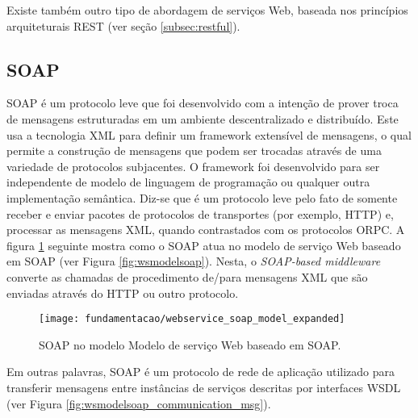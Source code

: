 Existe também outro tipo de abordagem de serviços Web, baseada nos princípios arquiteturais REST (ver seção \ref{subsec:restful}).

\subsection{SOAP}
\label{subsec:soap}
SOAP é um protocolo leve que foi desenvolvido com a intenção de prover troca de mensagens estruturadas em um ambiente descentralizado e distribuído. Este usa a tecnologia XML para definir um framework extensível de mensagens, o qual permite a construção de mensagens que podem ser trocadas através de uma variedade de protocolos subjacentes. O framework foi desenvolvido para ser independente de modelo de linguagem de programação ou qualquer outra implementação semântica\cite{w3c:soap}. Diz-se que é um protocolo leve pelo fato de somente receber e enviar pacotes de protocolos de transportes (por exemplo, HTTP) e, processar as mensagens XML, quando contrastados com os protocolos ORPC\cite{Papazoglou_slides:2008}. A figura \ref{fig:wsmodelsoap_expanded} seguinte mostra como o SOAP atua no modelo de serviço Web baseado em SOAP (ver Figura \ref{fig:wsmodelsoap}). Nesta, o \textit{SOAP-based middleware} converte as chamadas de procedimento de/para mensagens XML que são enviadas através do HTTP ou outro protocolo.

\begin{figure}[!htb] \centering 
  \centering
  \texttt{[image: fundamentacao/webservice\_soap\_model\_expanded]} 
  \caption{SOAP no modelo Modelo de serviço Web baseado em SOAP.\cite{Papazoglou_slides:2008}} 
  \label{fig:wsmodelsoap_expanded}
\end{figure}

Em outras palavras, SOAP é um protocolo de rede de aplicação utilizado para transferir mensagens entre instâncias de serviços descritas por interfaces WSDL (ver Figura \ref{fig:wsmodelsoap_communication_msg}).

